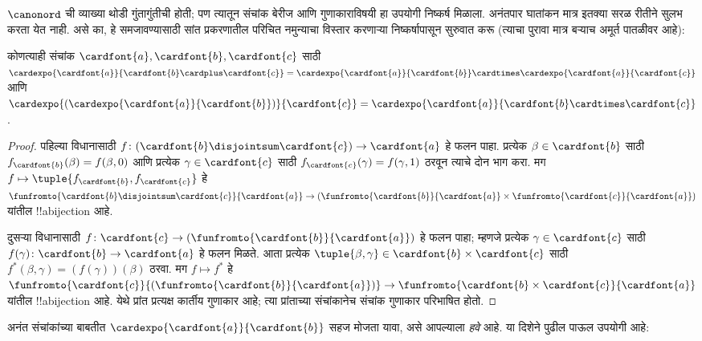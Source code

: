 \documentclass[../../../include/open-logic-section]{subfiles}
\begin{document}


$\canonord$ ची व्याख्या थोडी गुंतागुंतीची होती; पण त्यातून संचांक बेरीज आणि गुणाकाराविषयी  हा उपयोगी निष्कर्ष मिळाला. अनंतपार घातांकन मात्र इतक्या सरळ रीतीने सुलभ करता येत नाही. असे का, हे समजावण्यासाठी सांत प्रकरणातील परिचित नमुन्याचा विस्तार करणाऱ्या निष्कर्षापासून सुरुवात करू (त्याचा पुरावा मात्र बऱ्याच अमूर्त पातळीवर आहे):

\begin{prop}
कोणत्याही संचांक $\cardfont{a}, \cardfont{b}, \cardfont{c}$ साठी
$\cardexpo{\cardfont{a}}{\cardfont{b} \cardplus \cardfont{c}} =
\cardexpo{\cardfont{a}}{\cardfont{b}} \cardtimes
\cardexpo{\cardfont{a}}{\cardfont{c}}$ आणि
$\cardexpo{(\cardexpo{\cardfont{a}}{\cardfont{b}})}{\cardfont{c}} =
\cardexpo{\cardfont{a}}{\cardfont{b} \cardtimes \cardfont{c}}$.
\end{prop}

\begin{proof}
पहिल्या विधानासाठी $f \colon
(\cardfont{b}\disjointsum\cardfont{c}) \to \cardfont{a}$ हे फलन पाहा. प्रत्येक
$\beta \in \cardfont{b}$ साठी $f_\cardfont{b}(\beta) = f(\beta, 0)$ आणि प्रत्येक
$\gamma \in \cardfont{c}$ साठी $f_\cardfont{c}(\gamma) = f(\gamma, 1)$ ठरवून त्याचे दोन भाग करा. मग $f \mapsto
\tuple{f_{\cardfont{b}}, f_{\cardfont{c}}}$ हे
$\funfromto{\cardfont{b} \disjointsum \cardfont{c}}{\cardfont{a}} \to
(\funfromto{\cardfont{b}}{\cardfont{a}} \times
\funfromto{\cardfont{c}}{\cardfont{a}})$ यांतील !!a{bijection} आहे.

दुसऱ्या विधानासाठी $f \colon \cardfont{c} \to
(\funfromto{\cardfont{b}}{\cardfont{a}})$ हे फलन पाहा; म्हणजे प्रत्येक $\gamma \in
\cardfont{c}$ साठी $f(\gamma) \colon \cardfont{b} \to
\cardfont{a}$ हे फलन मिळते. आता प्रत्येक $\tuple{\beta, \gamma} \in \cardfont{b} \times \cardfont{c}$ साठी $f^*(\beta, \gamma) = (f(\gamma))(\beta)$ ठरवा.
मग $f \mapsto f^*$ हे
$\funfromto{\cardfont{c}}{(\funfromto{\cardfont{b}}{\cardfont{a}})}
\to \funfromto{\cardfont{b} \times \cardfont{c}}{\cardfont{a}}$ यांतील !!a{bijection} आहे. येथे प्रांत प्रत्यक्ष कार्तीय गुणाकार आहे; त्या प्रांताच्या संचांकानेच संचांक गुणाकार परिभाषित होतो.
\end{proof}

अनंत संचांकांच्या बाबतीत $\cardexpo{\cardfont{a}}{\cardfont{b}}$ सहज मोजता यावा, असे आपल्याला \emph{हवे} आहे. या दिशेने पुढील पाऊल उपयोगी आहे:
\end{document}
